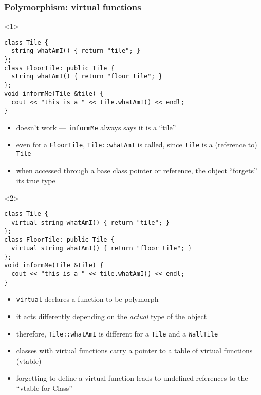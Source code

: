 \documentclass{slides}
\begin{document}
\begin{frame}[fragile]
  \frametitle{Polymorphism: virtual functions}

  \begin{onlyenv}<1>
\begin{lstlisting}
class Tile {
  string whatAmI() { return "tile"; }
};
class FloorTile: public Tile {
  string whatAmI() { return "floor tile"; }
};
void informMe(Tile &tile) {
  cout << "this is a " << tile.whatAmI() << endl;
}
\end{lstlisting}

    \begin{itemize}
    \item doesn't work --- \lstinline!informMe! always says it is a ``tile''
    \item even for a \lstinline!FloorTile!, \lstinline!Tile::whatAmI!
      is called, since \lstinline!tile! is a (reference to) \lstinline!Tile!
    \item when accessed through a base class pointer or reference,
      the object ``forgets'' its true type
    \end{itemize}
  \end{onlyenv}

  \begin{onlyenv}<2>
\begin{lstlisting}[emph={virtual}]
class Tile {
  virtual string whatAmI() { return "tile"; }
};
class FloorTile: public Tile {
  virtual string whatAmI() { return "floor tile"; }
};
void informMe(Tile &tile) {
  cout << "this is a " << tile.whatAmI() << endl;
}
\end{lstlisting}

    \begin{itemize}
    \item \lstinline!virtual! declares a function to be \alert{polymorph}
    \item it acts differently depending on the \emph{actual} type of the object
    \item therefore, \lstinline!Tile::whatAmI! is different for a
      \lstinline!Tile! and a \lstinline!WallTile!
    \item classes with virtual functions carry a pointer to a table of
      virtual functions (vtable)
    \item forgetting to define a virtual function leads to undefined
      references to the ``vtable for Class''
    \end{itemize}
  \end{onlyenv}
\end{frame}
\end{document}
